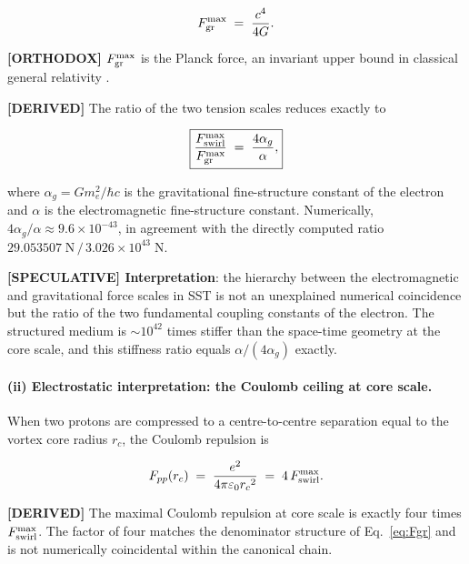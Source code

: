\documentclass[11pt]{article}
\theoremstyle{definition}
\theoremstyle{plain}
\theoremstyle{remark}
\newcommand{\rc}{{r_c}}
\begin{document}
        \begin{align}
            F_{\rm gr}^{\max} \;=\; \frac{c^4}{4G}.
            \label{eq:Fgr}
        \end{align}

        \textbf{[ORTHODOX]} $F_{\rm gr}^{\max}$ is the Planck force, an invariant upper bound in classical general relativity \cite{Gibbons2002}.

        \textbf{[DERIVED]} The ratio of the two tension scales reduces exactly to

        \begin{align}
            \boxed{
            \frac{F_{\rm swirl}^{\max}}{F_{\rm gr}^{\max}}
            \;=\; \frac{4\alpha_g}{\alpha},
            }
            \label{eq:Fmax_ratio}
        \end{align}

        where $\alpha_g = Gm_e^2/\hbar c$ is the gravitational fine-structure constant of the electron and $\alpha$ is the electromagnetic fine-structure constant. Numerically, $4\alpha_g/\alpha \approx 9.6\times10^{-43}$, in agreement with the directly computed ratio $29.053507\;\text{N}\,/\,3.026\times10^{43}\;\text{N}$.

        \textbf{[SPECULATIVE] Interpretation}: the hierarchy between the electromagnetic and gravitational force scales in SST is not an unexplained numerical coincidence but the ratio of the two fundamental coupling constants of the electron. The structured medium is $\sim\!10^{42}$ times stiffer than the space-time geometry at the core scale, and this stiffness ratio equals $\alpha/(4\alpha_g)$ exactly.

        \paragraph{(ii) Electrostatic interpretation: the Coulomb ceiling at core scale.}

        When two protons are compressed to a centre-to-centre separation equal to the vortex core radius $\rc$, the Coulomb repulsion is

        \begin{align}
            F_{pp}(\rc)
            \;=\; \frac{e^2}{4\pi\varepsilon_0 \rc^2}
            \;=\; 4\,F_{\rm swirl}^{\max}.
            \label{eq:Coulomb_core}
        \end{align}

        \textbf{[DERIVED]} The maximal Coulomb repulsion at core scale is exactly four times $F_{\rm swirl}^{\max}$. The factor of four matches the denominator structure of Eq.~\eqref{eq:Fgr} and is not numerically coincidental within the canonical chain.
\end{document}
